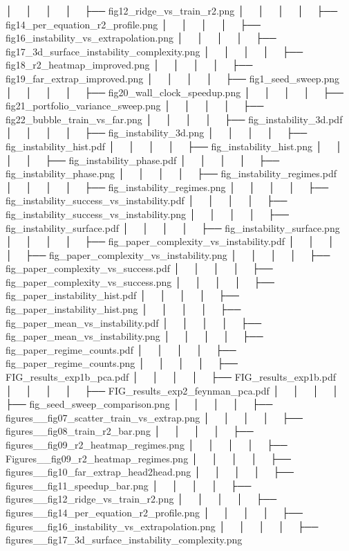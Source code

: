 │   │       │   │   ├── fig12_ridge_vs_train_r2.png
│   │       │   │   ├── fig14_per_equation_r2_profile.png
│   │       │   │   ├── fig16_instability_vs_extrapolation.png
│   │       │   │   ├── fig17_3d_surface_instability_complexity.png
│   │       │   │   ├── fig18_r2_heatmap_improved.png
│   │       │   │   ├── fig19_far_extrap_improved.png
│   │       │   │   ├── fig1_seed_sweep.png
│   │       │   │   ├── fig20_wall_clock_speedup.png
│   │       │   │   ├── fig21_portfolio_variance_sweep.png
│   │       │   │   ├── fig22_bubble_train_vs_far.png
│   │       │   │   ├── fig_instability_3d.pdf
│   │       │   │   ├── fig_instability_3d.png
│   │       │   │   ├── fig_instability_hist.pdf
│   │       │   │   ├── fig_instability_hist.png
│   │       │   │   ├── fig_instability_phase.pdf
│   │       │   │   ├── fig_instability_phase.png
│   │       │   │   ├── fig_instability_regimes.pdf
│   │       │   │   ├── fig_instability_regimes.png
│   │       │   │   ├── fig_instability_success_vs_instability.pdf
│   │       │   │   ├── fig_instability_success_vs_instability.png
│   │       │   │   ├── fig_instability_surface.pdf
│   │       │   │   ├── fig_instability_surface.png
│   │       │   │   ├── fig_paper_complexity_vs_instability.pdf
│   │       │   │   ├── fig_paper_complexity_vs_instability.png
│   │       │   │   ├── fig_paper_complexity_vs_success.pdf
│   │       │   │   ├── fig_paper_complexity_vs_success.png
│   │       │   │   ├── fig_paper_instability_hist.pdf
│   │       │   │   ├── fig_paper_instability_hist.png
│   │       │   │   ├── fig_paper_mean_vs_instability.pdf
│   │       │   │   ├── fig_paper_mean_vs_instability.png
│   │       │   │   ├── fig_paper_regime_counts.pdf
│   │       │   │   ├── fig_paper_regime_counts.png
│   │       │   │   ├── FIG_results_exp1b_pca.pdf
│   │       │   │   ├── FIG_results_exp1b.pdf
│   │       │   │   ├── FIG_results_exp2_feynman_pca.pdf
│   │       │   │   ├── fig_seed_sweep_comparison.png
│   │       │   │   ├── figures__fig07_scatter_train_vs_extrap.png
│   │       │   │   ├── figures__fig08_train_r2_bar.png
│   │       │   │   ├── figures__fig09_r2_heatmap_regimes.png
│   │       │   │   ├── Figures__fig09_r2_heatmap_regimes.png
│   │       │   │   ├── figures__fig10_far_extrap_head2head.png
│   │       │   │   ├── figures__fig11_speedup_bar.png
│   │       │   │   ├── figures__fig12_ridge_vs_train_r2.png
│   │       │   │   ├── figures__fig14_per_equation_r2_profile.png
│   │       │   │   ├── figures__fig16_instability_vs_extrapolation.png
│   │       │   │   ├── figures__fig17_3d_surface_instability_complexity.png
